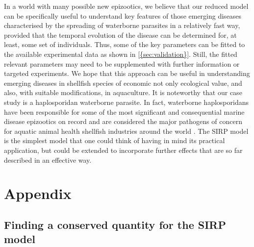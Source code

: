 In a world with many possible new epizootics, we believe that our reduced model
can be specifically useful to understand key features of those emerging
diseases characterised by the spreading of waterborne parasites in a relatively
fast way, provided that the temporal evolution of the disease can be determined
for, at least, some set of individuals. Thus, some of the key parameters can be
fitted to the available experimental data as shown in \cref{{sec:validation}}.
Still, the fitted relevant parameters may need to be supplemented with further
information or targeted experiments. We hope that this approach can be useful
in understanding emerging diseases in shellfish species of economic not only
ecological value, and also, with suitable modifications, in aquaculture. It is
noteworthy that our case study is a haplosporidan waterborne parasite.	In
fact, waterborne haplosporidans have been responsible for some of the most
significant and consequential marine disease epizootics on record and are
considered the major pathogens of concern for aquatic animal health shellfish
industries around the world \cite{Arzul2015}. The SIRP model is the simplest
model that one could think of having in mind its practical application, but
could be extended to incorporate further effects that are so far described in
an effective way.

\section{Appendix}

\subsection{Finding a conserved quantity for the SIRP model}
\label{app:P_exact}

